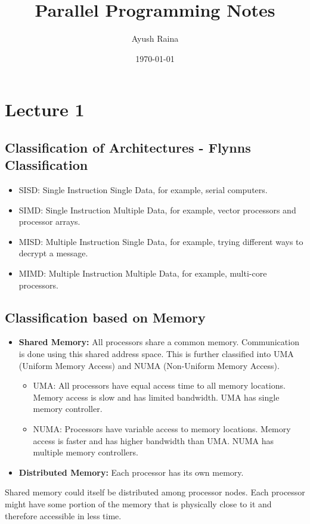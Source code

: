 \documentclass{article}
\title{Parallel Programming Notes}
\author{Ayush Raina}
\date{\today}
\begin{document}
\maketitle

\section*{Lecture 1}
\subsection*{Classification of Architectures - Flynns Classification}
\begin{itemize}
    \item SISD: Single Instruction Single Data, for example, serial computers.
    \item SIMD: Single Instruction Multiple Data, for example, vector processors and processor arrays.
    \item MISD: Multiple Instruction Single Data, for example, trying different ways to decrypt a message.
    \item MIMD: Multiple Instruction Multiple Data, for example, multi-core processors.
\end{itemize}

\subsection*{Classification based on Memory}
\begin{itemize}
    \item \textbf{Shared Memory:} All processors share a common memory. Communication is done using this shared address space. This is further classified into UMA (Uniform Memory Access) and NUMA (Non-Uniform Memory Access).
    \begin{itemize}
        \item UMA: All processors have equal access time to all memory locations. Memory access is slow and has limited bandwidth. UMA has single memory controller.
        \item NUMA: Processors have variable access to memory locations. Memory access is faster and has higher bandwidth than UMA. NUMA has multiple memory controllers.
    \end{itemize}
    \item \textbf{Distributed Memory:} Each processor has its own memory. 
\end{itemize}

Shared memory could itself be distributed among processor nodes. Each processor might have some portion of the memory that is physically close to it and therefore accessible in less time.
\end{document}
